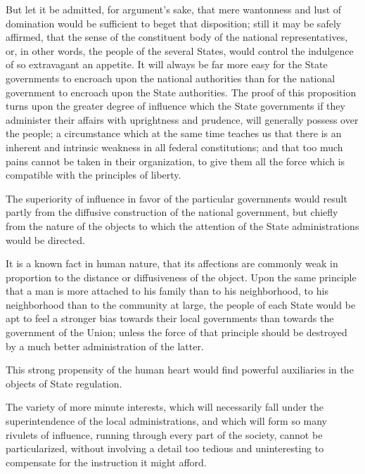 But let it be admitted, for argument's sake, that mere wantonness and lust of domination would be sufficient to beget that disposition; still it may be safely affirmed, that the sense of the constituent body of the national representatives, or, in other words, the people of the several States, would control the indulgence of so extravagant an appetite. 
It will always be far more easy for the State governments to encroach upon the national authorities than for the national government to encroach upon the State authorities. 
The proof of this proposition turns upon the greater degree of influence which the State governments if they administer their affairs with uprightness and prudence, will generally possess over the people; a circumstance which at the same time teaches us that there is an inherent and intrinsic weakness in all federal constitutions; and that too much pains cannot be taken in their organization, to give them all the force which is compatible with the principles of liberty.

The superiority of influence in favor of the particular governments would result partly from the diffusive construction of the national government, but chiefly from the nature of the objects to which the attention of the State administrations would be directed.

It is a known fact in human nature, that its affections are commonly weak in proportion to the distance or diffusiveness of the object. 
Upon the same principle that a man is more attached to his family than to his neighborhood, to his neighborhood than to the community at large, the people of each State would be apt to feel a stronger bias towards their local governments than towards the government of the Union; unless the force of that principle should be destroyed by a much better administration of the latter.

This strong propensity of the human heart would find powerful auxiliaries in the objects of State regulation.

The variety of more minute interests, which will necessarily fall under the superintendence of the local administrations, and which will form so many rivulets of influence, running through every part of the society, cannot be particularized, without involving a detail too tedious and uninteresting to compensate for the instruction it might afford.

